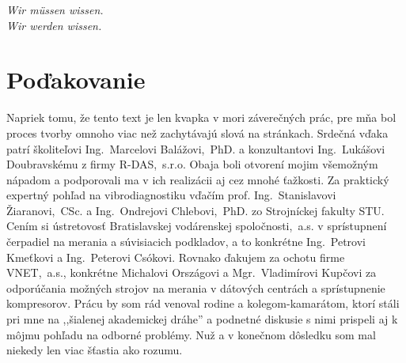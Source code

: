 \thispagestyle{empty}
\vspace*{\fill}

\begin{center}
\settowidth{}
\parbox{\longest}{
  \hrulefill\hspace{0.2cm} \decofourleft\decofourright \hspace{0.2cm} \hrulefill\par
  \raggedright{
  \itshape
  	Wir müssen wissen. \\ Wir werden wissen.\par
  }   
  \par
  \hrulefill\hspace{0.2cm} \decofourleft\decofourright\hspace{0.2cm} \hrulefill\par
}
\end{center}

\vspace*{\fill}
\section*{Poďakovanie}
{\linespread{1.0}\small Napriek tomu, že tento text je len kvapka v mori záverečných prác, pre mňa bol proces tvorby omnoho viac než zachytávajú slová na stránkach. Srdečná vďaka patrí školiteľovi Ing.~Marcelovi Balážovi,~PhD. a konzultantovi Ing.~Lukášovi Doubravskému z firmy R-DAS,~s.r.o. Obaja boli otvorení mojim všemožným nápadom a podporovali ma v ich realizácii aj cez mnohé ťažkosti. Za praktický expertný pohľad na vibrodiagnostiku vďačím prof. Ing.~Stanislavovi Žiaranovi,~CSc. a Ing.~Ondrejovi Chlebovi,~PhD. zo Strojníckej fakulty STU. Cením si ústretovosť Bratislavskej vodárenskej spoločnosti,~a.s. v sprístupnení čerpadiel na merania a súvisiacich podkladov, a to konkrétne Ing.~Petrovi Kmeťkovi a Ing.~Peterovi Csókovi. Rovnako ďakujem za ochotu firme VNET,~a.s., konkrétne Michalovi Országovi a Mgr.~Vladimírovi Kupčovi za odporúčania možných strojov na merania v dátových centrách a sprístupnenie kompresorov. Prácu by som rád venoval rodine a kolegom-kamarátom, ktorí stáli pri mne na ,,šialenej akademickej dráhe'' a podnetné diskusie s nimi prispeli aj k môjmu pohľadu na odborné problémy. Nuž a v konečnom dôsledku som mal niekedy len viac šťastia ako rozumu.}
\vspace{3cm}